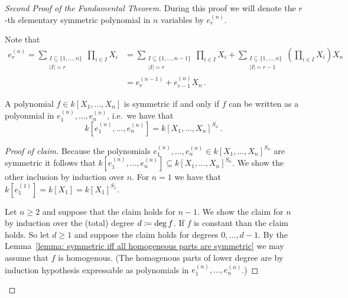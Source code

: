 \begin{proof}[Second Proof of the Fundamental Theorem]
  During this proof we will denote the $r$-th elementary symmetric polynomial in $n$ variables by $e^{(n)}_r$.
  
  Note that
  \begin{equation}
    \label{equation: recursive formel for elementary symmetric polynomials}
    \tag{$\ast$}
    \begin{aligned}
          e^{(n)}_r
      =  \sum_{\substack{I \subseteq \{1, \dotsc, n\} \\ |I| = r}} \prod_{i \in I} X_i
      &=    \sum_{\substack{I \subseteq \{1, \dotsc, n-1\} \\ |I| = r}} \prod_{i \in I} X_i
          + \sum_{\substack{I \subseteq \{1, \dotsc, n\} \\ |I| = r-1}} \left( \prod_{i \in I} X_i \right) X_n  \\
      &=  e^{(n-1)}_r + e^{(n)}_{r-1} X_n \,.
    \end{aligned}
  \end{equation}
  \begin{claim}
    A polynomial $f \in k[X_1, \dotsc, X_n]$ is symmetric if and only if $f$ can be written as a polyonmial in $e^{(n)}_1, \dotsc, e^{(n)}_n$, i.e.\ we have that
    \[
        k\left[ e^{(n)}_1, \dotsc, e^{(n)}_n \right]
      = k[X_1, \dotsc, X_n]^{S_n} \,.
    \]
  \end{claim}
  \begin{proof}[Proof of claim]
    Because the polynomials $e^{(n)}_1, \dotsc, e^{(n)}_n \in k[X_1, \dotsc, X_n]^{S_n}$ are symmetric it follows that $k[ e^{(n)}_1, \dotsc, e^{(n)}_n ] \subseteq k[X_1, \dotsc, X_n]^{S_n}$.
    We show the other inclusion by induction over $n$.
    For $n = 1$ we have that $k[ e^{(1)}_1 ] = k[X_1] = k[X_1]^{S_1}$.
    
    Let $n \geq 2$ and suppose that the claim holds for $n-1$.
    We show the claim for $n$ by induction over the (total) degree $d \coloneqq \deg f$.
    If $f$ is constant than the claim holds.
    So let $d \geq 1$ and suppose the claim holds for degrees $0, \dotsc, d-1$.
    By the Lemma~\ref{lemma: symmetric iff all homogeneous parts are symmetric} we may assume that $f$ is homogenous.
    (The homogenous parts of lower degree are by induction hypothesis expressable as polynomials in $e^{(n)}_1, \dotsc, e^{(n)}_n$.)
    

\end{proof}
\end{proof}
